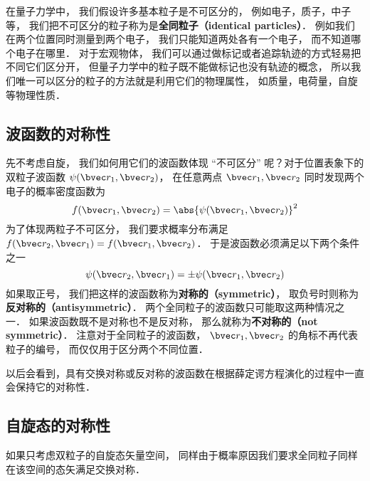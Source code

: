 

在量子力学中， 我们假设许多基本粒子是不可区分的， 例如电子，质子，中子等， 我们把不可区分的粒子称为是\textbf{全同粒子（identical particles）}． 例如我们在两个位置同时测量到两个电子， 我们只能知道两处各有一个电子， 而不知道哪个电子在哪里． 对于宏观物体， 我们可以通过做标记或者追踪轨迹的方式轻易把不同它们区分开， 但量子力学中的粒子既不能做标记也没有轨迹的概念， 所以我们唯一可以区分的粒子的方法就是利用它们的物理属性， 如质量，电荷量，自旋等物理性质．

\subsection{波函数的对称性}
先不考虑自旋， 我们如何用它们的波函数体现 “不可区分” 呢？对于位置表象下的双粒子波函数 $\psi(\bvec r_1, \bvec r_2)$， 在任意两点 $\bvec r_1, \bvec r_2$ 同时发现两个电子的概率密度函数为%
\begin{equation}
f(\bvec r_1, \bvec r_2) = \abs{\psi(\bvec r_1, \bvec r_2)}^2
\end{equation}
为了体现两粒子不可区分， 我们要求概率分布满足 $f(\bvec r_2, \bvec r_1) = f(\bvec r_1, \bvec r_2)$． 于是波函数必须满足以下两个条件之一
\begin{equation}\label{IdPar_eq5}
\psi(\bvec r_2, \bvec r_1) = \pm \psi(\bvec r_1, \bvec r_2)
\end{equation}
如果取正号， 我们把这样的波函数称为\textbf{对称的（symmetric）}， 取负号时则称为\textbf{反对称的（antisymmetric）}． 两个全同粒子的波函数只可能取这两种情况之一． 如果波函数既不是对称也不是反对称， 那么就称为\textbf{不对称的（not symmetric）}． 注意对于全同粒子的波函数， $\bvec r_1, \bvec r_2$ 的角标不再代表粒子的编号， 而仅仅用于区分两个不同位置．

以后会看到，具有交换对称或反对称的波函数在根据薛定谔方程演化的过程中一直会保持它的对称性． %

\subsection{自旋态的对称性}
如果只考虑双粒子的自旋态矢量空间， 同样由于概率原因我们要求全同粒子同样在该空间的态矢满足交换对称．

